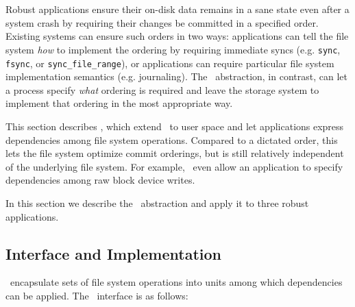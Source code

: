 \section{\Patchgroups}
\label{sec:patchgroup}

\newcommand{\pgCreate}{\texttt{pg\_create}}
\newcommand{\pgDepend}{\texttt{pg\_depend}}
\newcommand{\pgEngage}{\texttt{pg\_engage}}
\newcommand{\pgDisengage}{\texttt{pg\_disengage}}
\newcommand{\pgRelease}{\texttt{pg\_release}}
\newcommand{\pgSync}{\texttt{pg\_sync}}
\newcommand{\pgClose}{\texttt{pg\_close}}

Robust applications
%
ensure their on-disk data remains in a sane state even after a
system crash by requiring their changes be committed in
a specified order.
%
Existing systems can ensure such orders in two ways:
%
applications can tell the file system \emph{how} to implement the
ordering by requiring immediate syncs
(e.g. \texttt{sync}, \texttt{fsync}, or \texttt{sync\_file\_range}),
%
or applications can require particular file system implementation
semantics (e.g. journaling).
%
%
The \patch\ abstraction, in contrast, can let a process specify
\emph{what} ordering is required and leave the storage system to implement
that ordering in the most appropriate way.


This section describes \emph{\patchgroups}, which extend \patches\ to user
space and let applications express dependencies among file system
operations.
%
Compared to a dictated order, this lets the file system optimize commit
orderings, but is still relatively independent of the underlying file
system.
%
For example, \patchgroups\ even allow an application to specify
dependencies among raw block device writes.

In this section we describe the \patchgroup\ abstraction
%
and apply it to three robust applications.


\subsection{Interface and Implementation}
\label{sec:patchgroup:interface}

\Patchgroups\ encapsulate sets of file system operations into units among
which dependencies can be applied.
%
%
The \patchgroup\ interface is as follows:

